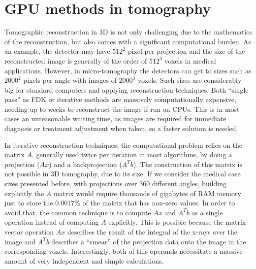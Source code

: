
\chapter{GPU methods in tomography}

Tomographic reconstruction in 3D is not only challenging due to the mathematics of the reconstruction, but also comes with a significant computational burden. As an example, the detector may have $512^2$ pixel per projection and the size of the reconstructed image is generally of the order of $512^3$ voxels in medical applications. However, in micro-tomography the detectors can get to sizes such as $2000^2$ pixels per angle with images of $2000^3$ voxels. Such sizes are considerably big for standard computers and applying reconstruction techniques. Both ``single pass'' as FDK or iterative methods are massively computationally expensive, needing up to weeks to reconstruct the image if run on CPUs. This is in most cases an unreasonable waiting time, as images are required for immediate  diagnosis or treatment adjustment when taken, so a faster solution is needed.

In iterative reconstruction techniques, the computational problem relies on the matrix $A$, generally used twice per iteration in most algorithms, by doing a projection ($A x$) and a backprojection ($A^T b$). The construction of this matrix is not possible in 3D tomography, due to its size. If we consider the medical case sizes presented before, with projections over 360 different angles, building explicitly the $A$ matrix would require thousands of gigabytes of RAM memory just to store the $0.0017\%$ of the matrix that has non-zero values. In order to avoid that, the common technique is to compute $A x$ and $A^T b$ as a single operation instead of computing $A$ explicitly. This is possible because the matrix-vector operation $A x$ describes the result of the integral of the x-rays over the image and $A^T b$ describes a ``smear'' of the projection data onto the image in the corresponding voxels. Interestingly, both of this operands necessitate a massive amount of very independent and simple calculations.

